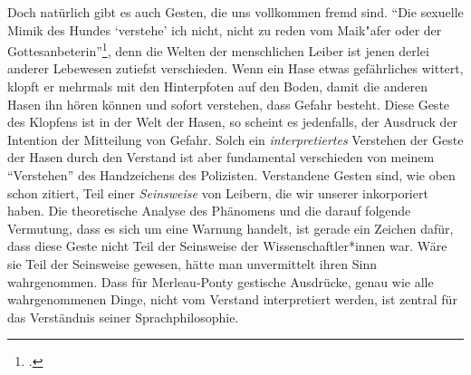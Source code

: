 \documentclass[a4paper, 12pt]{article}
\begin{document}
\begin{onehalfspace}
Doch natürlich gibt es auch Gesten, die uns vollkommen fremd sind. "`Die sexuelle Mimik des Hundes `verstehe' ich nicht, nicht zu reden vom Maik"afer oder der Gottesanbeterin"'\footnote{\Cite[Siehe][S. 219]{merleau1966phanomenologie}.}, denn die Welten der menschlichen Leiber ist jenen derlei anderer Lebewesen zutiefst verschieden. Wenn ein Hase etwas gefährliches wittert, klopft er mehrmals mit den Hinterpfoten auf den Boden, damit die anderen Hasen ihn hören können und sofort verstehen, dass Gefahr besteht. Diese Geste des Klopfens ist in der Welt der Hasen, so scheint es jedenfalls, der Ausdruck der Intention der Mitteilung von Gefahr. Solch ein \emph{interpretiertes} Verstehen der Geste der Hasen durch den Verstand ist aber fundamental verschieden von meinem "`Verstehen"' des Handzeichens des Polizisten. Verstandene Gesten sind, wie oben schon zitiert, Teil einer \emph{Seinsweise} von Leibern, die wir unserer inkorporiert haben. Die theoretische Analyse des Phänomens und die darauf folgende Vermutung, dass es sich um eine Warnung handelt, ist gerade ein Zeichen dafür, dass diese Geste nicht Teil der Seinsweise der Wissenschaftler*innen war. Wäre sie Teil der Seinsweise gewesen, hätte man unvermittelt ihren Sinn wahrgenommen. Dass für Merleau-Ponty gestische Ausdrücke, genau wie alle wahrgenommenen Dinge, nicht vom Verstand interpretiert werden, ist zentral für das Verständnis seiner Sprachphilosophie. 


\end{onehalfspace}
\end{document}
